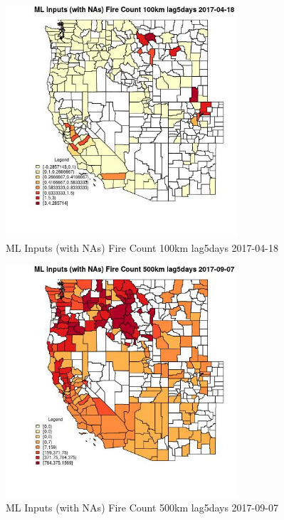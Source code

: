 \begin{figure} 
\centering  
\includegraphics[width=0.77\textwidth]{Code_Outputs/Report_ML_input_PM25_Step4_part_e_de_duplicated_aves_compiled_2019-05-21wNAs_CountyFire_Count_100km_lag5daysMean2017-04-18.jpg} 
\caption{\label{fig:Report_ML_input_PM25_Step4_part_e_de_duplicated_aves_compiled_2019-05-21wNAsCountyFire_Count_100km_lag5daysMean2017-04-18}ML Inputs (with NAs) Fire Count 100km lag5days 2017-04-18} 
\end{figure} 
 

\begin{figure} 
\centering  
\includegraphics[width=0.77\textwidth]{Code_Outputs/Report_ML_input_PM25_Step4_part_e_de_duplicated_aves_compiled_2019-05-21wNAs_CountyFire_Count_500km_lag5daysMean2017-09-07.jpg} 
\caption{\label{fig:Report_ML_input_PM25_Step4_part_e_de_duplicated_aves_compiled_2019-05-21wNAsCountyFire_Count_500km_lag5daysMean2017-09-07}ML Inputs (with NAs) Fire Count 500km lag5days 2017-09-07} 
\end{figure} 
 

